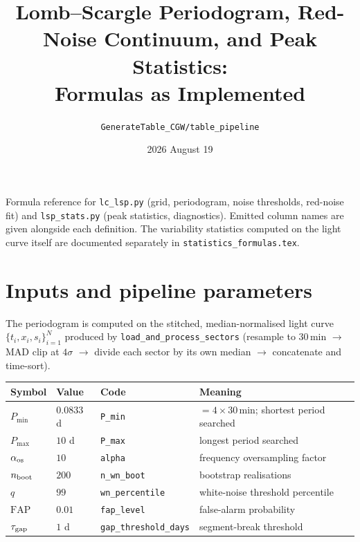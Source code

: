 \documentclass[11pt]{article}
\title{Lomb--Scargle Periodogram, Red-Noise Continuum, and Peak Statistics:\\
       Formulas as Implemented}
\author{\texttt{GenerateTable\_CGW/table\_pipeline}}
\date{2026 August 19}
\begin{document}
\maketitle

Formula reference for \texttt{lc\_lsp.py} (grid, periodogram, noise thresholds,
red-noise fit) and \texttt{lsp\_stats.py} (peak statistics, diagnostics). Emitted column
names are given alongside each definition. The variability statistics computed on the
light curve itself are documented separately in \texttt{statistics\_formulas.tex}.

\section{Inputs and pipeline parameters}

The periodogram is computed on the stitched, median-normalised light curve
$\{t_i, x_i, s_i\}_{i=1}^{N}$ produced by \texttt{load\_and\_process\_sectors}
(resample to $30$\,min $\to$ MAD clip at $4\sigma$ $\to$ divide each sector by its own
median $\to$ concatenate and time-sort).

\begin{table}[htbp]
\centering
\begin{tabular}{llll}
\toprule
Symbol & Value & Code & Meaning \\
\midrule
$P_{\min}$      & $0.0833$ d & \texttt{P\_min}        & $= 4\times30$\,min; shortest period searched \\
$P_{\max}$      & $10$ d     & \texttt{P\_max}        & longest period searched \\
$\alpha_{\rm os}$ & $10$     & \texttt{alpha}         & frequency oversampling factor \\
$n_{\rm boot}$  & $200$      & \texttt{n\_wn\_boot}   & bootstrap realisations \\
$q$             & $99$       & \texttt{wn\_percentile}& white-noise threshold percentile \\
$\mathrm{FAP}$  & $0.01$     & \texttt{fap\_level}    & false-alarm probability \\
$\tau_{\rm gap}$& $1$ d      & \texttt{gap\_threshold\_days} & segment-break threshold \\
\bottomrule
\end{tabular}
\end{table}
\end{document}
